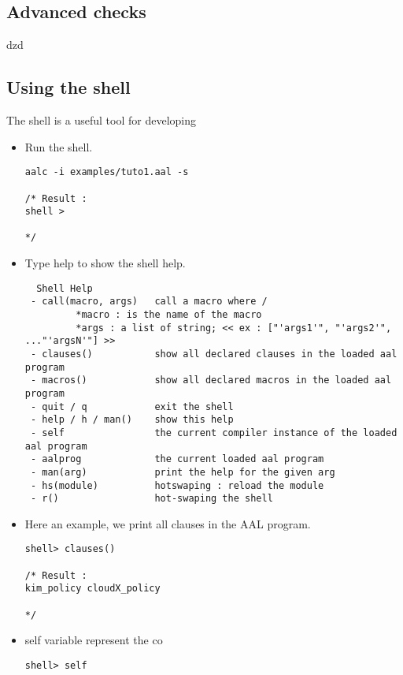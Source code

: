 \subsection{Advanced checks}
dzd



\subsection{Using the shell}
The shell is a useful tool for developing 


{
\lstset{style=shell}

\begin{itemize}
	\item Run the shell.
\begin{lstlisting}
aalc -i examples/tuto1.aal -s

/* Result : 
shell >

*/
\end{lstlisting}

  \item Type help to show the shell help.
\begin{lstlisting}
  Shell Help
 - call(macro, args)   call a macro where /
         *macro : is the name of the macro
         *args : a list of string; << ex : ["'args1'", "'args2'", ..."'argsN'"] >>
 - clauses()           show all declared clauses in the loaded aal program
 - macros()            show all declared macros in the loaded aal program
 - quit / q            exit the shell
 - help / h / man()    show this help
 - self                the current compiler instance of the loaded aal program
 - aalprog             the current loaded aal program 
 - man(arg)            print the help for the given arg
 - hs(module)          hotswaping : reload the module
 - r()                 hot-swaping the shell
\end{lstlisting}

  \item Here an example, we print all clauses in the AAL program.
\begin{lstlisting}
shell> clauses()

/* Result :
kim_policy cloudX_policy 

*/
\end{lstlisting}

  \item self variable represent the co
\begin{lstlisting}
shell> self


\end{lstlisting}
\end{itemize}}

